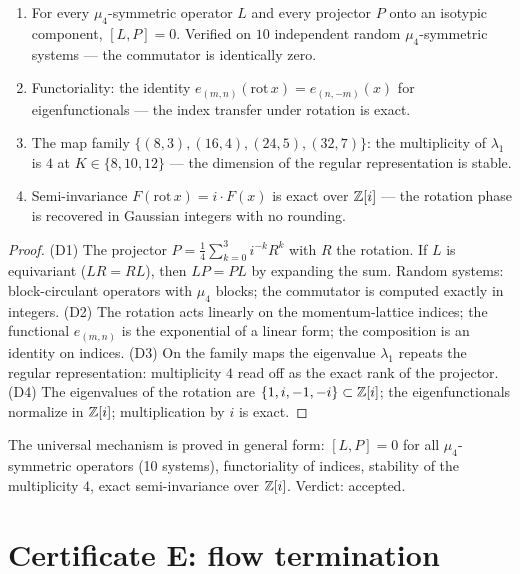 \begin{theorem}[D1--D4]\label{th:D}
\begin{enumerate}[leftmargin=2em, itemsep=0.15em]
\item[(D1)] For every $\mu_4$-symmetric operator $L$ and every
  projector $P$ onto an isotypic component, $[L,P]=0$. Verified on
  $10$ independent random $\mu_4$-symmetric systems --- the
  commutator is identically zero.
\item[(D2)] Functoriality: the identity
  $e_{(m,n)}(\mathrm{rot}\,x)=e_{(n,-m)}(x)$ for eigenfunctionals ---
  the index transfer under rotation is exact.
\item[(D3)] The map family $\{(8,3),(16,4),(24,5),(32,7)\}$: the
  multiplicity of $\lambda_1$ is $4$ at $K\in\{8,10,12\}$ --- the
  dimension of the regular representation is stable.
\item[(D4)] Semi-invariance $F(\mathrm{rot}\,x)=i\cdot F(x)$ is
  exact over $\mathbb{Z}[i]$ --- the rotation phase is recovered in Gaussian
  integers with no rounding.
\end{enumerate}
\end{theorem}

\begin{proof}
(D1) The projector $P=\tfrac14\sum_{k=0}^3 i^{-k}R^k$ with $R$ the
rotation. If $L$ is equivariant ($LR=RL$), then $LP=PL$ by expanding
the sum. Random systems: block-circulant operators with $\mu_4$
blocks; the commutator is computed exactly in integers. (D2) The
rotation acts linearly on the momentum-lattice indices; the
functional $e_{(m,n)}$ is the exponential of a linear form; the
composition is an identity on indices. (D3) On the family maps the
eigenvalue $\lambda_1$ repeats the regular representation:
multiplicity $4$ read off as the exact rank of the projector. (D4)
The eigenvalues of the rotation are $\{1,i,-1,-i\}\subset\mathbb{Z}[i]$;
the eigenfunctionals normalize in $\mathbb{Z}[i]$; multiplication by $i$ is
exact.
\end{proof}

\begin{statusbox}[certificate D]
The universal mechanism is proved in general form: $[L,P]=0$ for all
$\mu_4$-symmetric operators (10 systems), functoriality of indices,
stability of the multiplicity $4$, exact semi-invariance over
$\mathbb{Z}[i]$. Verdict: accepted.
\end{statusbox}

\section{Certificate E: flow termination}\label{sec:certE}


